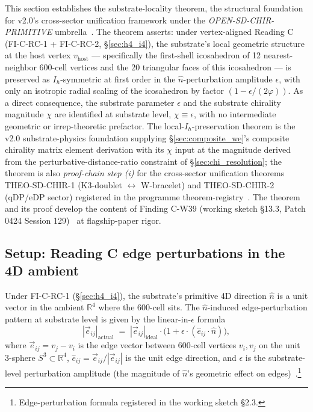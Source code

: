 \documentclass[11pt,letterpaper]{article}
\newcommand{\phig}{\varphi}
\begin{document}
This section establishes the substrate-locality theorem, the structural foundation for v2.0's cross-sector unification framework under the \emph{OPEN-SD-CHIR-PRIMITIVE} umbrella~\cite{abshier_research_frontier}. The theorem asserts: under vertex-aligned Reading C (FI-C-RC-1 + FI-C-RC-2, \S\ref{sec:h4_i4}), the substrate's local geometric structure at the host vertex $v_{\text{host}}$ --- specifically the first-shell icosahedron of 12 nearest-neighbor 600-cell vertices and the 20 triangular faces of this icosahedron --- is preserved as $I_h$-symmetric at first order in the $\hat{n}$-perturbation amplitude $\epsilon$, with only an isotropic radial scaling of the icosahedron by factor $(1 - \epsilon/(2\phig))$. As a direct consequence, the substrate parameter $\epsilon$ and the substrate chirality magnitude $\chi$ are identified at substrate level, $\chi \equiv \epsilon$, with no intermediate geometric or irrep-theoretic prefactor. The local-$I_h$-preservation theorem is the v2.0 substrate-physics foundation supplying \S\ref{sec:composite_we}'s composite chirality matrix element derivation with its $\chi$ input at the magnitude derived from the perturbative-distance-ratio constraint of \S\ref{sec:chi_resolution}; the theorem is also \emph{proof-chain step (i)} for the cross-sector unification theorems THEO-SD-CHIR-1 (K3-doublet $\leftrightarrow$ W-bracelet) and THEO-SD-CHIR-2 (qDP/eDP sector) registered in the programme theorem-registry~\cite{abshier_theorem_registry}. The theorem and its proof develop the content of Finding C-W39 (working sketch \S13.3, Patch 0424 Session 129)~\cite{abshier_capotauro_chiral_mechanism_sketch} at flagship-paper rigor.

\subsection{Setup: Reading C edge perturbations in the 4D ambient}\label{sec:substrate_locality_4d_geometry}

Under FI-C-RC-1 (\S\ref{sec:h4_i4}), the substrate's primitive 4D direction $\hat{n}$ is a unit vector in the ambient $\mathbb{R}^4$ where the 600-cell sits. The $\hat{n}$-induced edge-perturbation pattern at substrate level is given by the linear-in-$\epsilon$ formula
\begin{equation}\label{eq:edge_perturbation}
|\vec{e}_{ij}|_{\text{actual}} \;=\; |\vec{e}_{ij}|_{\text{ideal}} \cdot \bigl(1 + \epsilon \cdot (\hat{e}_{ij} \cdot \hat{n})\bigr),
\end{equation}
where $\vec{e}_{ij} = v_j - v_i$ is the edge vector between 600-cell vertices $v_i, v_j$ on the unit 3-sphere $S^3 \subset \mathbb{R}^4$, $\hat{e}_{ij} = \vec{e}_{ij}/|\vec{e}_{ij}|$ is the unit edge direction, and $\epsilon$ is the substrate-level perturbation amplitude (the magnitude of $\hat{n}$'s geometric effect on edges)~\cite{abshier_capotauro_chiral_mechanism_sketch}.\footnote{Edge-perturbation formula registered in the working sketch \S2.3.}
\end{document}
